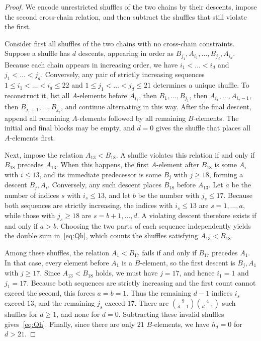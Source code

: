 \documentclass[11pt]{amsart}
\theoremstyle{remark}
\numberwithin{equation}{section}
\begin{document}
\begin{proof}
We encode unrestricted shuffles of the two chains by their descents, impose the
second cross-chain relation, and then subtract the shuffles that still violate
the first.

Consider first all shuffles of the two chains with no cross-chain constraints.
Suppose a shuffle has $d$ descents, appearing in order as
$B_{j_1},A_{i_1},\dots,B_{j_d},A_{i_d}$. Because each chain appears in
increasing order, we have $i_1<\dots<i_d$ and $j_1<\dots<j_d$. Conversely, any
pair of strictly increasing sequences $1\le i_1<\dots<i_d\le22$ and
$1\le j_1<\dots<j_d\le21$ determines a unique shuffle. To reconstruct it, list
all $A$-elements before $A_{i_1}$, then $B_1,\dots,B_{j_1}$, then
$A_{i_1},\dots,A_{i_2-1}$, then $B_{j_1+1},\dots,B_{j_2}$, and continue
alternating in this way. After the final descent, append all remaining
$A$-elements followed by all remaining $B$-elements. The initial and final
blocks may be empty, and $d=0$ gives the shuffle that places all $A$-elements
first.

Next, impose the relation $A_{13}<B_{18}$. A shuffle violates this relation if
and only if $B_{18}$ precedes $A_{13}$. When this happens, the first
$A$-element after $B_{18}$ is some $A_i$ with $i\le13$, and its immediate
predecessor is some $B_j$ with $j\ge18$, forming a descent $B_j,A_i$.
Conversely, any such descent places $B_{18}$ before $A_{13}$. Let $a$ be the
number of indices $s$ with $i_s\le13$, and let $b$ be the number with
$j_s\le17$. Because both sequences are strictly increasing, the indices with
$i_s\le13$ are $s=1,\dots,a$, while those with $j_s\ge18$ are $s=b+1,\dots,d$.
A violating descent therefore exists if and only if $a>b$. Choosing the two
parts of each sequence independently yields the double sum in~\eqref{eq:Qh},
which counts the shuffles satisfying $A_{13}<B_{18}$.

Among these shuffles, the relation $A_1<B_{17}$ fails if and only if $B_{17}$
precedes $A_1$. In that case, every element before $A_1$ is a $B$-element, so
the first descent is $B_j,A_1$ with $j\ge17$. Since $A_{13}<B_{18}$ holds, we
must have $j=17$, and hence $i_1=1$ and $j_1=17$. Because both sequences are
strictly increasing and the first count cannot exceed the second, this forces
$a=b=1$. Thus the remaining $d-1$ indices $i_s$ exceed $13$, and the remaining
$j_s$ exceed $17$. There are $\binom9{d-1}\binom4{d-1}$ such shuffles for
$d\ge1$, and none for $d=0$. Subtracting these invalid shuffles
gives~\eqref{eq:Qh}. Finally, since there are only $21$ $B$-elements, we have
$h_d=0$ for $d>21$.
\end{proof}
\end{document}
